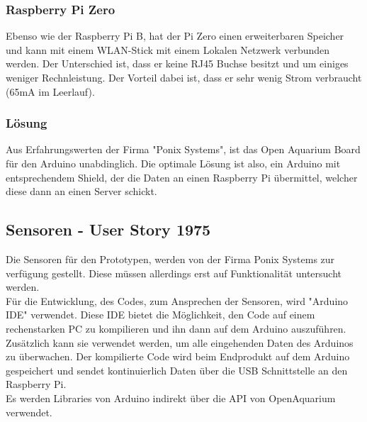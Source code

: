 \subsubsection{Raspberry Pi Zero}
Ebenso wie der Raspberry Pi B, hat der Pi Zero einen erweiterbaren Speicher und kann mit einem WLAN-Stick mit einem Lokalen Netzwerk verbunden werden. Der Unterschied ist, dass er keine RJ45 Buchse besitzt und um einiges weniger Rechnleistung. Der Vorteil dabei ist, dass er sehr wenig Strom verbraucht (65mA im Leerlauf).
\subsubsection{L\"osung}
Aus Erfahrungswerten der Firma "Ponix Systems", ist das Open Aquarium Board f\"ur den Arduino unabdinglich. Die optimale L\"osung ist also, ein Arduino mit entsprechendem Shield, der die Daten an einen Raspberry Pi \"ubermittel, welcher diese dann an einen Server schickt.
\newpage

\subsection{Sensoren - User Story 1975}
Die Sensoren f\"ur den Prototypen, werden von der Firma Ponix Systems zur verf\"ugung gestellt. Diese m\"ussen allerdings erst auf Funktionalit\"at untersucht werden. \\
F\"ur die Entwicklung, des Codes, zum Ansprechen der Sensoren, wird "Arduino IDE" verwendet. Diese IDE bietet die M\"oglichkeit, den Code auf einem rechenstarken PC zu kompilieren und ihn dann auf dem Arduino auszuf\"uhren. Zus\"atzlich kann sie verwendet werden, um alle eingehenden Daten des Arduinos zu \"uberwachen.
Der kompilierte Code wird beim Endprodukt auf dem Arduino gespeichert und sendet kontinuierlich Daten \"uber die USB Schnittstelle an den Raspberry Pi.\\
Es werden Libraries von Arduino indirekt \"uber die API von OpenAquarium verwendet.

